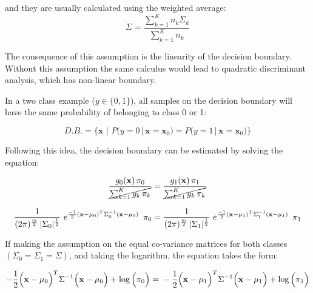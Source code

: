 \noindent
and they are usually calculated using the weighted average:
\begin{equation} 
\Sigma = \frac{\sum_{k=1}^K {n_k\Sigma_k}}{\sum_{k=1}^K{n_k}}
\end{equation}

\noindent
The consequence of this assumption is the linearity of the decision boundary. Without this assumption the same calculus would lead to quadratic discriminant analysis, which has non-linear boundary.

In a two class example ($y \in \{0,1\}$), all samples on the decision boundary will have the same probability of belonging to class 0 or 1:

\begin{equation} 
D.B. = \Big\{\mathbf{x}\,\, \Big| \,\,P\big(y=0 \, \big| \, \mathbf{x}=\mathbf{x}_0\big) = P\big(y=1 \, \big| \, \mathbf{x}=\mathbf{x}_0\big) \Big\}
\end{equation}

Following this idea, the decision boundary can be estimated by solving the equation:

\begin{equation} 
\frac{g_0(\mathbf{x}) \, \pi_0} {\cancel{\sum_{k=1}^K{g_k \, \pi_k}}} = \frac{g_1(\mathbf{x}) \, \pi_1} {\cancel{\sum_{k=1}^K{g_k \, \pi_k}}}
\end{equation}


\begin{equation} 
\frac{1}{(2 \pi)^{\nicefrac{m}{2}}\, |\Sigma_0|^{\nicefrac{1}{2}}}\,\, e^{\nicefrac{-1}{2}  (\mathbf{x}-\mu_0)^T  \Sigma_0^{-1} (\mathbf{x}-\mu_0)}  \,\,\,\pi_0 = \\
\frac{1}{(2 \pi)^{\nicefrac{m}{2}}\, |\Sigma_1|^{\nicefrac{1}{2}}}\,\, e^{\nicefrac{-1}{2}  (\mathbf{x}-\mu_1)^T  \Sigma_1^{-1} (\mathbf{x}-\mu_1)}  \,\,\,\pi_1
\end{equation}

If making the assumption on the equal co-variance matrices for both classes $(\Sigma_0 = \Sigma_1  = \Sigma)$, and taking the logarithm, the equation takes the form: 


\begin{equation} 
-\frac{1}{2}  \Big(\mathbf{x}-\mu_0\Big)^T  \Sigma^{-1} \Big(\mathbf{x}-\mu_0\Big) +  \log{\Big(\pi_0\Big)}= \\
-\frac{1}{2}  \Big(\mathbf{x}-\mu_1\Big)^T  \Sigma^{-1} \Big(\mathbf{x}-\mu_1\Big) +  \log{\Big(\pi_1\Big)}
\end{equation}


